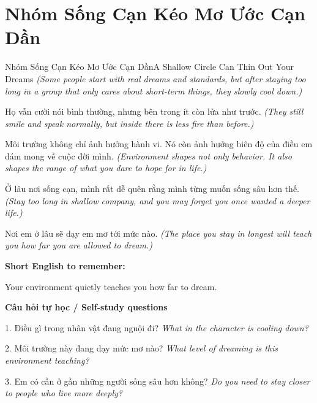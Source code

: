 \section{Nhóm Sống Cạn Kéo Mơ Ước Cạn Dần}
\begin{truyen}{Nhóm Sống Cạn Kéo Mơ Ước Cạn Dần}{A Shallow Circle Can Thin Out Your Dreams}
\textit{(Some people start with real dreams and standards, but after staying too long in a group that only cares about short-term things, they slowly cool down.)}

Họ vẫn cười nói bình thường, nhưng bên trong ít còn lửa như trước.
\textit{(They still smile and speak normally, but inside there is less fire than before.)}

Môi trường không chỉ ảnh hưởng hành vi. Nó còn ảnh hưởng biên độ của điều em dám mong về cuộc đời mình.
\textit{(Environment shapes not only behavior. It also shapes the range of what you dare to hope for in life.)}

Ở lâu nơi sống cạn, mình rất dễ quên rằng mình từng muốn sống sâu hơn thế.
\textit{(Stay too long in shallow company, and you may forget you once wanted a deeper life.)}

\end{truyen}

\begin{baihoc}
Nơi em ở lâu sẽ dạy em mơ tới mức nào.
\textit{(The place you stay in longest will teach you how far you are allowed to dream.)}
\end{baihoc}

\begin{ghinhoanh}
\textbf{Short English to remember:}

Your environment quietly teaches you how far to dream.

\end{ghinhoanh}

\begin{tuhocnhanh}
\textbf{Câu hỏi tự học / Self-study questions}

1. Điều gì trong nhân vật đang nguội đi? \textit{What in the character is cooling down?}

2. Môi trường này đang dạy mức mơ nào? \textit{What level of dreaming is this environment teaching?}

3. Em có cần ở gần những người sống sâu hơn không? \textit{Do you need to stay closer to people who live more deeply?}
\end{tuhocnhanh}
\ngancach

